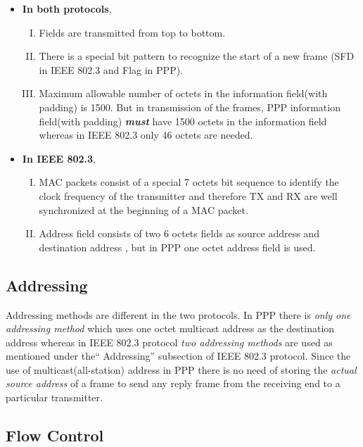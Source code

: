 \documentclass[a4paper,11pt]{article}%
\begin{document}
\begin{itemize}
	\item \textbf{In both protocols}, 
	\begin{enumerate}[I.]
		\item Fields are transmitted from top to bottom.
		\item There is a special bit pattern to recognize the start of a new frame (SFD in IEEE 802.3 and Flag in PPP).
		\item Maximum allowable number of octets in the information field(with padding) is 1500.  But in transmission of the frames, PPP information field(with padding) \textbf{\textit{must}} have 1500 octets in the information field whereas in IEEE 802.3 only 46 octets are needed. 
		
	\end{enumerate}

	\item \textbf{In IEEE 802.3},
	\begin{enumerate}[I.]
		\item MAC packets consist of a special 7 octets bit sequence to identify the clock frequency of the transmitter and therefore TX and RX are well synchronized at the beginning of a MAC packet.
		
		\item Address field consists of two 6 octets fields as source address and destination address , but in PPP one octet address field is used.
	\end{enumerate}
	

	
	
\end{itemize}  



\subsection{Addressing}

Addressing methods are different in the two protocols. In PPP there is \textit{only one addressing method} which uses one octet multicast address as the destination address whereas in IEEE 802.3 protocol \textit{two addressing methods} are used as mentioned under the`` Addressing'' subsection of IEEE  802.3 protocol. Since the use of multicast(all-station) address in PPP there is no need of storing the \textit{actual source address} of a frame to send any reply frame from the receiving end to a particular transmitter.

\subsection{Flow Control}
\end{document}
